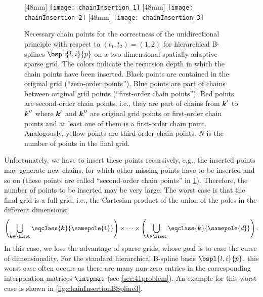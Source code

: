 \begin{figure}
  [48mm]{%
    \texttt{[image: chainInsertion\_1]}%
  }%
  \hfill%
  [48mm]{%
    \texttt{[image: chainInsertion\_2]}%
  }%
  \hfill%
  [48mm]{%
    \texttt{[image: chainInsertion\_3]}%
  }%
  \caption[%
    Chain points for hierarchical B-splines on a sparse grid%
  ]{%
    Necessary chain points for the correctness of the unidirectional principle
    with respect to $(t_1, t_2) = (1, 2)$
    for hierarchical B-splines $\bspl{l,i}{p}$ on a
    two-dimensional spatially adaptive sparse grid.
    The colors indicate the recursion depth in which the
    chain points have been inserted.
    Black points are contained in the original grid
    (``zero-order points'').
    \textcolor{C0}{Blue points} are part of chains
    between original grid points (``first-order chain points'').
    \textcolor{C1}{Red points} are second-order chain points,
    i.e., they are part of chains
    from ${\boldsymbol{k}}'$ to ${\boldsymbol{k}}''$ where ${\boldsymbol{k}}'$ and ${\boldsymbol{k}}''$ are
    original grid points or first-order chain points
    and at least one of them is a first-order chain point.
    Analogously,
    \textcolor{C2}{yellow points} are third-order chain points.
    $N$ is the number of points in the final grid.%
  }%
  \label{fig:chainInsertionBSpline}%
\end{figure}

Unfortunately, we have to insert these points recursively,
e.g., the inserted points may generate new chains,
for which other missing points have to be inserted and so on
(these points are called ``second-order chain points''
in \cref{fig:chainInsertionBSpline}).
Therefore, the number of points to be inserted may be very large.
The worst case is that the final grid is a full grid, i.e.,
the Cartesian product of the union of the poles in the different dimensions:
\begin{equation}
  \left(\bigcup_{\*k \in \liset} \eqclass{\*k}{\samepole{1}}\right)
  \times \dotsb \times
  \left(\bigcup_{\*k \in \liset} \eqclass{\*k}{\samepole{d}}\right).
\end{equation}
In this case, we lose the advantage of sparse grids,
whose goal is to ease the curse of dimensionality.
For the standard hierarchical B-spline basis $\bspl{l,i}{p}$,
this worst case often occurs as there are many non-zero entries
in the corresponding interpolation matrices $\intpmat$
(see \cref{sec:41problem}).
An example for this worst case is shown in \cref{fig:chainInsertionBSpline3}.



